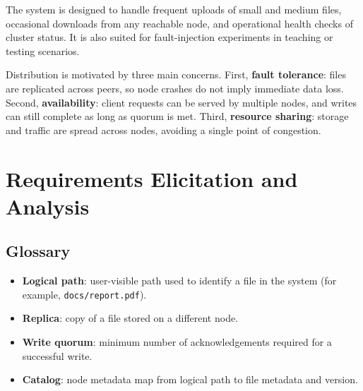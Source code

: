 \documentclass{scrartcl}
\begin{document}
The system is designed to handle frequent uploads of small and medium files, occasional downloads from any reachable node, and operational health checks of cluster status. It is also suited for fault-injection experiments in teaching or testing scenarios.

Distribution is motivated by three main concerns. First, \textbf{fault tolerance}: files are replicated across peers, so node crashes do not imply immediate data loss. Second, \textbf{availability}: client requests can be served by multiple nodes, and writes can still complete as long as quorum is met. Third, \textbf{resource sharing}: storage and traffic are spread across nodes, avoiding a single point of congestion.

\section{Requirements Elicitation and Analysis}\label{requirements}

\subsection*{Glossary}
\begin{itemize}
  \item \textbf{Logical path}: user-visible path used to identify a file in the system (for example, \texttt{docs/report.pdf}).
  \item \textbf{Replica}: copy of a file stored on a different node.
  \item \textbf{Write quorum}: minimum number of acknowledgements required for a successful write.
  \item \textbf{Catalog}: node metadata map from logical path to file metadata and version.
\end{itemize}
\end{document}
